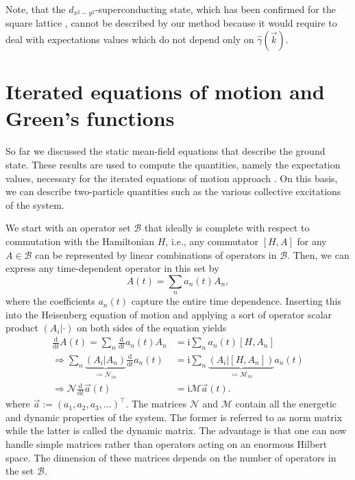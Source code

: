 \documentclass[
    reprint, 
    aps,
    preprintnumbers,
    twocolumn,
    prb,
    superscriptaddress
]{revtex4-2}
\newcommand{\vk}{\vec{k}}
\newcommand{\im}{\mathrm{i}}
\newcommand{\ddt}{\frac{\mathrm{d}}{\mathrm{d}t}}
\newcommand{\mM}{\mathcal{M}}
\newcommand{\mN}{\mathcal{N}}
\newcommand{\bs}{\begin{subequations}}
\newcommand{\es}{\end{subequations}}
\begin{document}
Note, that the $d_{x^2 - y^2}$-superconducting state, which has been confirmed for the square lattice 
\cite{Micnas88b,Huang13}, cannot be described by our method because it would require to 
deal with expectations values which do not depend only on $\widehat{\gamma}(\vk)$.


\section{Iterated equations of motion and Green's functions}
\label{sec:ieom}

So far we discussed the static mean-field equations that describe the ground state.
These results are used to compute the quantities, namely the expectation values, necessary for the iterated equations of motion approach \cite{uhrig09,hamerla13,hamerla14,bleicker18}.
On this basis, we can describe two-particle quantities such as the various collective excitations of the system.

We start with an operator set $\mathcal{B}$ that ideally is complete with respect to commutation with 
the Hamiltonian $H$, i.e., any commutator $[H, A]$ for any $A \in \mathcal{B}$ can be represented by linear combinations of operators in $\mathcal{B}$.
Then, we can express any time-dependent operator in this set by
\begin{equation}
    \label{eqn:time_dependent_operator}
    A(t) = \sum_n a_n(t) A_n,
\end{equation}
where the coefficients $a_n(t)$ capture the entire time dependence. 
Inserting this into the Heisenberg equation of motion and applying a sort of operator scalar product $(A_i|\cdot)$ 
on both sides of the equation yields
\bs
\begin{align}
        \ddt A(t) = \sum_n \ddt a_n(t) A_n &= \im \sum_n a_n(t) [H, A_n] \\
        \Rightarrow \sum_n \underbrace{(A_i | A_n)}_{\coloneqq \mN_{in}} \ddt a_n(t) &= 
				\im \sum_n \underbrace{(A_i | [H, A_n])}_{\coloneqq \mM_{in}} a_n(t) \\
        \Rightarrow \mN \ddt \vec{a}(t) &= \im \mM \vec{a}(t).
				    \label{eqn:heisenberg}
\end{align}
\es
where $\vec{a}:=(a_1, a_2, a_3,\ldots)^\top$.
The matrices $\mN$ and $\mM$ contain all the energetic and dynamic properties of the system.
The former is referred to as norm matrix while the latter is called the dynamic matrix.
The advantage is that one can now handle simple matrices rather than operators 
acting on an enormous Hilbert space.
The dimension of these matrices depends on the number of operators in the set $\mathcal{B}$.
\end{document}
